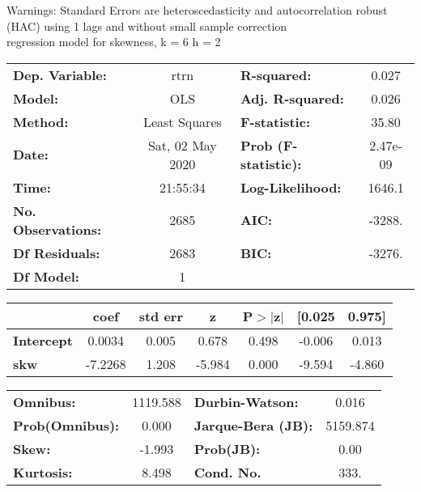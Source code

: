 Warnings: \newline
 [1] Standard Errors are heteroscedasticity and autocorrelation robust (HAC) using 1 lags and without small sample correction\\ 

regression model for skewness, k = 6 h = 2\begin{center}
\begin{tabular}{lclc}
\toprule
\textbf{Dep. Variable:}    &       rtrn       & \textbf{  R-squared:         } &     0.027   \\
\textbf{Model:}            &       OLS        & \textbf{  Adj. R-squared:    } &     0.026   \\
\textbf{Method:}           &  Least Squares   & \textbf{  F-statistic:       } &     35.80   \\
\textbf{Date:}             & Sat, 02 May 2020 & \textbf{  Prob (F-statistic):} &  2.47e-09   \\
\textbf{Time:}             &     21:55:34     & \textbf{  Log-Likelihood:    } &    1646.1   \\
\textbf{No. Observations:} &        2685      & \textbf{  AIC:               } &    -3288.   \\
\textbf{Df Residuals:}     &        2683      & \textbf{  BIC:               } &    -3276.   \\
\textbf{Df Model:}         &           1      & \textbf{                     } &             \\
\bottomrule
\end{tabular}
\begin{tabular}{lcccccc}
                   & \textbf{coef} & \textbf{std err} & \textbf{z} & \textbf{P$> |$z$|$} & \textbf{[0.025} & \textbf{0.975]}  \\
\midrule
\textbf{Intercept} &       0.0034  &        0.005     &     0.678  &         0.498        &       -0.006    &        0.013     \\
\textbf{skw}       &      -7.2268  &        1.208     &    -5.984  &         0.000        &       -9.594    &       -4.860     \\
\bottomrule
\end{tabular}
\begin{tabular}{lclc}
\textbf{Omnibus:}       & 1119.588 & \textbf{  Durbin-Watson:     } &    0.016  \\
\textbf{Prob(Omnibus):} &   0.000  & \textbf{  Jarque-Bera (JB):  } & 5159.874  \\
\textbf{Skew:}          &  -1.993  & \textbf{  Prob(JB):          } &     0.00  \\
\textbf{Kurtosis:}      &   8.498  & \textbf{  Cond. No.          } &     333.  \\
\bottomrule
\end{tabular}
\end{center}

